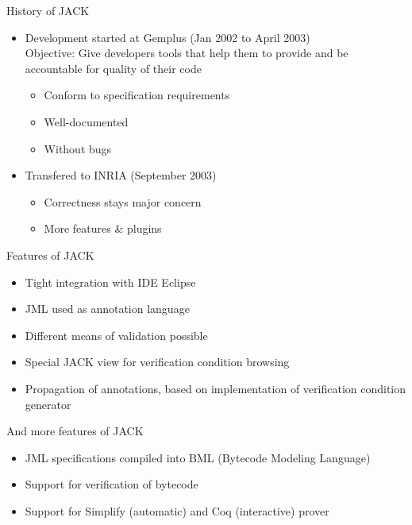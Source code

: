 \documentclass[final,nocolorBG,a4,mobius,nototal,pdf,slideColor]{prosper}
\begin{document}
\begin{slide}{History of JACK}
\begin{itemize}
\item Development started at Gemplus (Jan 2002 to April 2003)\\
Objective: Give developers tools that help them to provide and be
accountable for quality of their code
\begin{itemize}
\item Conform to specification requirements
\item Well-documented
\item Without bugs
\end{itemize}
\item Transfered to INRIA (September 2003)
\begin{itemize}
\item Correctness stays major concern
\item More features \& plugins
\end{itemize}
\end{itemize}
\end{slide}

\begin{slide}{Features of JACK}
\begin{itemize}
\item Tight integration with IDE Eclipse
\item JML used as annotation language
\item Different means of validation possible

\item Special JACK view for verification condition browsing
\item Propagation of annotations, based on implementation of
verification condition generator
\end{itemize}
\end{slide}

\begin{slide}{And more features of JACK}
\begin{itemize}
\item JML specifications compiled into BML (Bytecode Modeling Language)
\item Support for verification of bytecode 
\item Support for Simplify (automatic) and Coq (interactive) prover
\end{itemize}
\end{slide}
\end{document}
